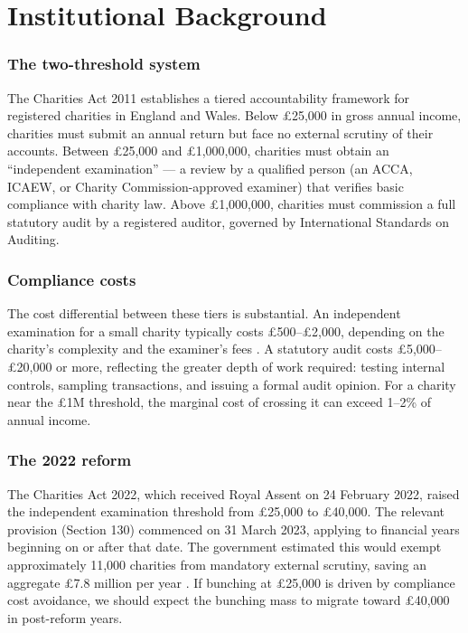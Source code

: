 \documentclass[12pt]{article}
\begin{document}
\section{Institutional Background}

\subsubsection*{The two-threshold system} The Charities Act 2011 establishes a tiered accountability framework for registered charities in England and Wales. Below \pounds25,000 in gross annual income, charities must submit an annual return but face no external scrutiny of their accounts. Between \pounds25,000 and \pounds1,000,000, charities must obtain an ``independent examination'' --- a review by a qualified person (an ACCA, ICAEW, or Charity Commission-approved examiner) that verifies basic compliance with charity law. Above \pounds1,000,000, charities must commission a full statutory audit by a registered auditor, governed by International Standards on Auditing.

\subsubsection*{Compliance costs} The cost differential between these tiers is substantial. An independent examination for a small charity typically costs \pounds500--\pounds2,000, depending on the charity's complexity and the examiner's fees \citep{ccguidance2015}. A statutory audit costs \pounds5,000--\pounds20,000 or more, reflecting the greater depth of work required: testing internal controls, sampling transactions, and issuing a formal audit opinion. For a charity near the \pounds1M threshold, the marginal cost of crossing it can exceed 1--2\% of annual income.

\subsubsection*{The 2022 reform} The Charities Act 2022, which received Royal Assent on 24 February 2022, raised the independent examination threshold from \pounds25,000 to \pounds40,000. The relevant provision (Section 130) commenced on 31 March 2023, applying to financial years beginning on or after that date. The government estimated this would exempt approximately 11,000 charities from mandatory external scrutiny, saving an aggregate \pounds7.8 million per year \citep{dcms2022}. If bunching at \pounds25,000 is driven by compliance cost avoidance, we should expect the bunching mass to migrate toward \pounds40,000 in post-reform years.
\end{document}
